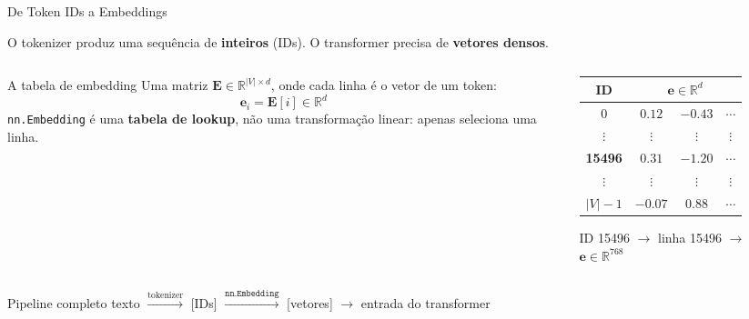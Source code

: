 \documentclass[aspectratio=169,xcolor=dvipsnames]{beamer}
\begin{document}
\begin{frame}[shrink=10]{De Token IDs a Embeddings}

O tokenizer produz uma sequência de \textbf{inteiros} (IDs). O transformer precisa de \textbf{vetores densos}.

\vspace{8pt}

\begin{columns}[T]
\begin{column}{0.48\textwidth}
\begin{block}{A tabela de embedding}
Uma matriz $\mathbf{E} \in \mathbb{R}^{|V| \times d}$, onde cada linha é o vetor de um token:
\[
  \mathbf{e}_i = \mathbf{E}[i] \in \mathbb{R}^d
\]
\texttt{nn.Embedding} é uma \textbf{tabela de lookup}, não uma transformação linear: apenas seleciona uma linha.
\end{block}
\end{column}
\begin{column}{0.48\textwidth}
\begin{center}
\renewcommand{\arraystretch}{1.2}
\small
\begin{tabular}{c|ccc}
\textbf{ID} & \multicolumn{3}{c}{$\mathbf{e} \in \mathbb{R}^d$} \\
\midrule
0   & $0.12$ & $-0.43$ & $\cdots$ \\
$\vdots$ & $\vdots$ & $\vdots$ & $\vdots$ \\
\rowcolor{lightblue}
\textbf{15496} & $\mathbf{0.31}$ & $\mathbf{-1.20}$ & $\mathbf{\cdots}$ \\
$\vdots$ & $\vdots$ & $\vdots$ & $\vdots$ \\
$|V|-1$ & $-0.07$ & $0.88$ & $\cdots$ \\
\end{tabular}

\vspace{4pt}
\small ID 15496 $\rightarrow$ linha 15496 $\rightarrow$ $\mathbf{e} \in \mathbb{R}^{768}$
\end{center}
\end{column}
\end{columns}

\vspace{6pt}

\begin{exampleblock}{Pipeline completo}
\centering
texto $\xrightarrow{\text{tokenizer}}$ [IDs] $\xrightarrow{\texttt{nn.Embedding}}$ [vetores] $\longrightarrow$ entrada do transformer
\end{exampleblock}

\end{frame}
\end{document}
